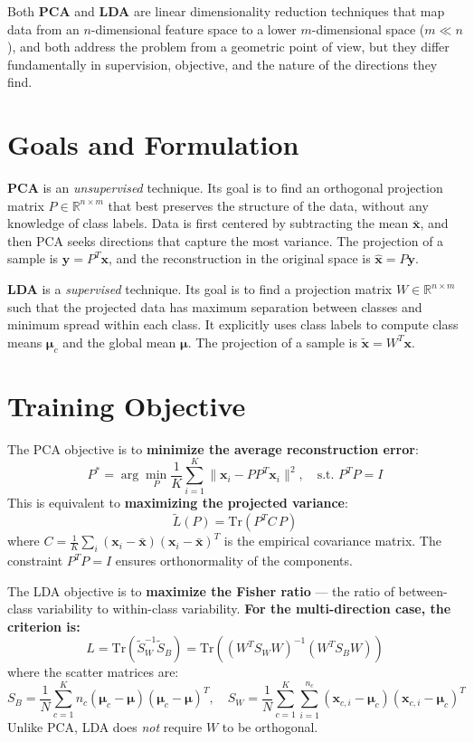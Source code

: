 Both \textbf{PCA} and \textbf{LDA} are linear dimensionality reduction techniques that map data from an $n$-dimensional feature space to a lower $m$-dimensional space ($m \ll n$), and both address the problem from a geometric point of view, but they differ fundamentally in supervision, objective, and the nature of the directions they find.

\bigskip
\section*{Goals and Formulation}

\textbf{PCA} is an \emph{unsupervised} technique. Its goal is to find an orthogonal projection matrix $P \in \mathbb{R}^{n \times m}$ that best preserves the structure of the data, without any knowledge of class labels. Data is first centered by subtracting the mean $\bar{\mathbf{x}}$, and then PCA seeks directions that capture the most variance. The projection of a sample is $\mathbf{y} = P^T\mathbf{x}$, and the reconstruction in the original space is $\hat{\mathbf{x}} = P\mathbf{y}$.

\textbf{LDA} is a \emph{supervised} technique. Its goal is to find a projection matrix $W \in \mathbb{R}^{n \times m}$ such that the projected data has maximum separation between classes and minimum spread within each class. It explicitly uses class labels to compute class means $\boldsymbol{\mu}_c$ and the global mean $\boldsymbol{\mu}$. The projection of a sample is $\tilde{\mathbf{x}} = W^T\mathbf{x}$.

\bigskip
\section*{Training Objective}

The PCA objective is to \textbf{minimize the average reconstruction error}:
\[
P^* = \arg\min_P \frac{1}{K}\sum_{i=1}^K \|\mathbf{x}_i - PP^T\mathbf{x}_i\|^2, \quad \text{s.t. } P^TP = I
\]
This is equivalent to \textbf{maximizing the projected variance}:
\[
\widetilde{L}(P) = \text{Tr}\!\left(P^T C\, P\right)
\]
where $C = \frac{1}{K}\sum_i (\mathbf{x}_i - \bar{\mathbf{x}})(\mathbf{x}_i - \bar{\mathbf{x}})^T$ is the empirical covariance matrix. The constraint $P^TP = I$ ensures orthonormality of the components.

The LDA objective is to \textbf{maximize the Fisher ratio} --- the ratio of between-class variability to within-class variability. \textbf{For the multi-direction case, the criterion is:}
\[
L = \text{Tr}\!\left(\widetilde{S}_W^{-1}\widetilde{S}_B\right) = \text{Tr}\!\left((W^T S_W W)^{-1}(W^T S_B W)\right)
\]
where the scatter matrices are:
\[
S_B = \frac{1}{N}\sum_{c=1}^K n_c(\boldsymbol{\mu}_c - \boldsymbol{\mu})(\boldsymbol{\mu}_c - \boldsymbol{\mu})^T, \quad S_W = \frac{1}{N}\sum_{c=1}^K \sum_{i=1}^{n_c}(\mathbf{x}_{c,i} - \boldsymbol{\mu}_c)(\mathbf{x}_{c,i} - \boldsymbol{\mu}_c)^T
\]
Unlike PCA, LDA does \emph{not} require $W$ to be orthogonal.

